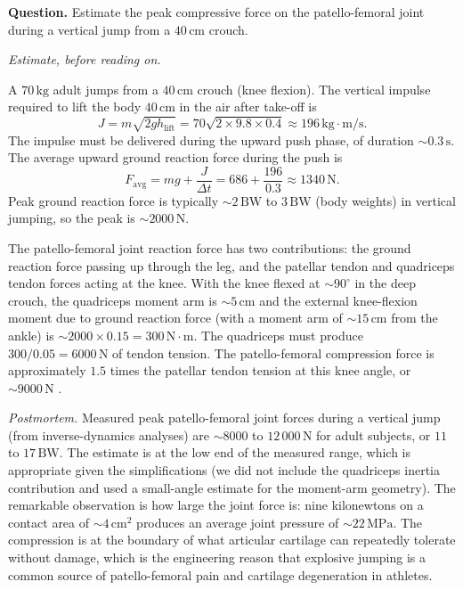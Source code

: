 \begin{estimation}
\textbf{Question.} Estimate the peak compressive force on the
patello-femoral joint during a vertical jump from a $40\,\text{cm}$
crouch.

\smallskip
\textit{Estimate, before reading on.}

\smallskip
A $70\,\text{kg}$ adult jumps from a $40\,\text{cm}$ crouch (knee
flexion). The vertical impulse required to lift the body $40\,\text{cm}$
in the air after take-off is
\[
J = m \sqrt{2 g h_{\text{lift}}} = 70 \sqrt{2 \times 9.8 \times 0.4} \approx 196\,\text{kg}\cdot\text{m}/\text{s}.
\]
The impulse must be delivered during the upward push phase, of
duration $\sim 0.3\,\text{s}$. The average upward ground reaction
force during the push is
\[
F_{\text{avg}} = m g + \frac{J}{\Delta t} = 686 + \frac{196}{0.3} \approx 1340\,\text{N}.
\]
Peak ground reaction force is typically $\sim 2\,\text{BW}$ to
$3\,\text{BW}$ (body weights) in vertical jumping, so the peak is
$\sim 2000\,\text{N}$.

The patello-femoral joint reaction force has two contributions: the
ground reaction force passing up through the leg, and the patellar
tendon and quadriceps tendon forces acting at the knee. With the knee
flexed at $\sim 90^{\circ}$ in the deep crouch, the quadriceps
moment arm is $\sim 5\,\text{cm}$ and the external knee-flexion
moment due to ground reaction force (with a moment arm of
$\sim 15\,\text{cm}$ from the ankle) is
$\sim 2000 \times 0.15 = 300\,\text{N}\cdot\text{m}$. The quadriceps
must produce $300/0.05 = 6000\,\text{N}$ of tendon tension. The
patello-femoral compression force is approximately $1.5$ times the
patellar tendon tension at this knee angle, or $\sim 9000\,\text{N}$
\cite[p.~1078]{paper:v6c06-pellegrino-2003}.

\smallskip
\textit{Postmortem.} Measured peak patello-femoral joint forces
during a vertical jump (from inverse-dynamics analyses) are
$\sim 8000$ to $12\,000\,\text{N}$ for adult subjects, or $11$ to
$17\,\text{BW}$. The estimate is at the low end of the measured
range, which is appropriate given the simplifications (we did not
include the quadriceps inertia contribution and used a small-angle
estimate for the moment-arm geometry). The remarkable observation is
how large the joint force is: nine kilonewtons on a contact area of
$\sim 4\,\text{cm}^2$ produces an average joint pressure of
$\sim 22\,\text{MPa}$. The compression is at the boundary of what
articular cartilage can repeatedly tolerate without damage, which is
the engineering reason that explosive jumping is a common source of
patello-femoral pain and cartilage degeneration in athletes.
\end{estimation}

